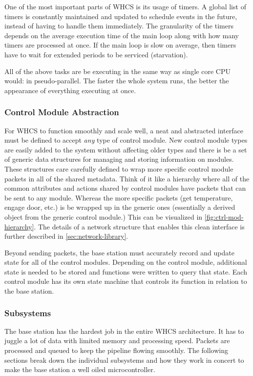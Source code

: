 One of the most important parts of WHCS is its usage of timers. A global list
of timers is constantly maintained and updated to schedule events
in the future, instead of having to handle them immediately. The granularity of
the timers depends on the average execution time of the main loop along
with how many timers are processed at once. If the main loop is slow on
average, then timers have to wait for extended periods to be serviced
(starvation).

All of the above tasks are be executing in the same way as single core CPU
would: in pseudo-parallel. The faster the whole system runs, the better the
appearance of everything executing at once.

\subsubsection{Control Module Abstraction}
For WHCS to function smoothly and scale well, a neat and abstracted interface
must be defined to accept \emph{any} type of control module. New control module
types are  easily added to the system without affecting older types and
there is be a set of generic data structures for managing and storing
information on modules. These structures care carefully defined to wrap more
specific control module packets in all of the shared metadata. Think of it like
a hierarchy where all of the common attributes and actions shared by control
modules have packets that can be sent to any module. Whereas the more specific
packets (get temperature, engage door, etc.) is be wrapped up in the generic
ones (essentially a derived object from the generic control module.) This can
be visualized in \autoref{fig:ctrl-mod-hierarchy}. The
details of a network structure that enables this clean interface is
further described in \autoref{sec:network-library}.


Beyond sending packets, the base station must accurately record and update
state for all of the control modules. Depending on the control module,
additional state is needed to be stored and functions were written
to query that state. Each control module has its own state machine that
controls its function in relation to the base station.

\subsubsection{Subsystems}
The base station has the hardest job in the entire WHCS architecture. It has to
juggle a lot of data with limited memory and processing speed. Packets are
processed and queued to keep the pipeline flowing smoothly. The following
sections break down the individual subsystems and how they work in concert
to make the base station a well oiled microcontroller.

